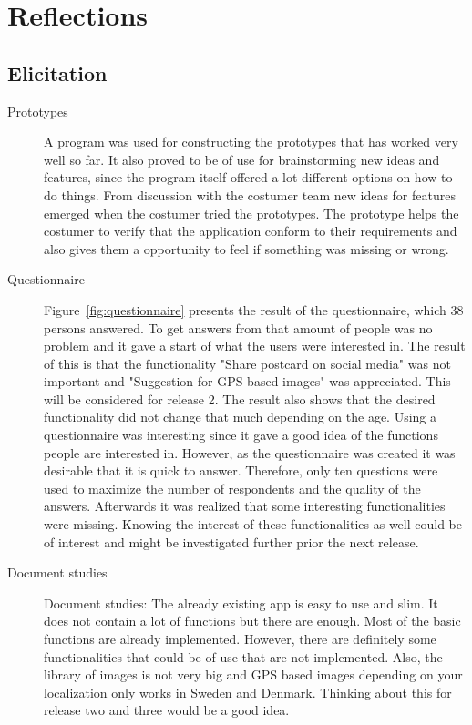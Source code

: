 \documentclass[10pt,a4paper]{article}
\begin{document}
\section{Reflections}

\subsection{Elicitation}
\begin{description}
\item[Prototypes] A program was used for constructing the prototypes that has worked very well so far. It also proved to be of use for brainstorming new ideas and features, since the program itself offered a lot different options on how to do things. 
From discussion with the costumer team new ideas for features emerged when the costumer tried the prototypes. The prototype helps the costumer to verify that the application conform to their requirements and also gives them a opportunity to feel if something was missing or wrong.

\item[Questionnaire] Figure~\ref{fig:questionnaire} presents the result of the questionnaire, which 38 persons answered. To get answers from that amount of people was no problem and it gave a start of what the users were interested in. The result of this is that the functionality "Share postcard on social media" was not important and "Suggestion for GPS-based images" was appreciated. This will be considered for release 2. The result also shows that the desired functionality did not change that much depending on the age. Using a questionnaire was interesting since it gave a good idea of the functions people are interested in. However, as the questionnaire  was created it was desirable that it is quick to answer. Therefore, only ten questions were used to maximize the number of respondents and the quality of the answers. Afterwards it was realized that some interesting functionalities were missing. Knowing the interest of these functionalities as well could be of interest and might be investigated further prior the next release.

\item[Document studies] Document studies: The already existing app is easy to use and slim. It does not contain a lot of functions but there are enough. Most of the basic functions are already implemented. However, there are definitely some functionalities that could be of use that are not implemented. Also, the library of images is not very big and GPS based images depending on your localization only works in Sweden and Denmark. Thinking about this for release two and three would be a good idea.


\end{description}
\end{document}
